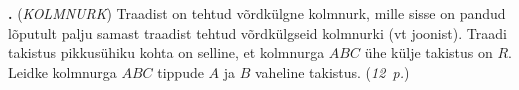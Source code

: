 \documentclass[11pt,a5paper]{article}
\newcommand{\numb}[1]{\vspace{5pt}\textbf{\large #1}}
\newcommand{\nimi}[1]{(\textsl{\small #1})}
\newcommand{\punktid}[1]{(\emph{#1~p.})}
\newcounter{ylesanne}
\newcommand{\yl}[1]{\addtocounter{ylesanne}{1}\numb{\theylesanne.} \nimi{#1} \newblock{}}
\newcommand{\autor}[1]{}%
\begin{document}
\yl{KOLMNURK}
Traadist on tehtud võrdkülgne kolmnurk, mille sisse on pandud lõputult palju samast traadist tehtud võrdkülgseid kolmnurki (vt joonist). Traadi takistus pikkusühiku kohta on selline, et kolmnurga $ABC$ ühe külje takistus on $R$. Leidke kolmnurga $ABC$ tippude $A$ ja $B$ vaheline takistus.
\punktid{12} \autor{Kaarel Kivisalu}

\begin{figure}[h]
  \centering
\end{figure}
\end{document}
